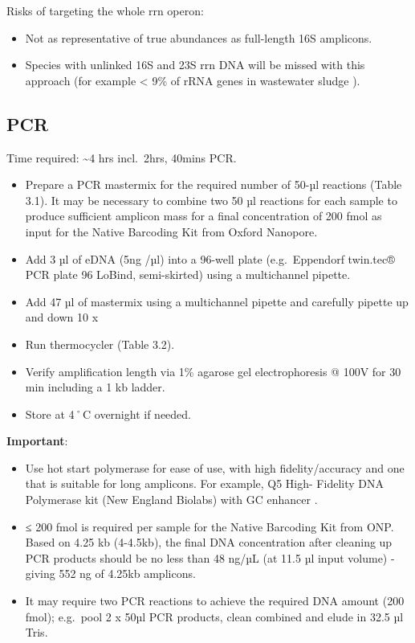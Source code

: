 \documentclass[
]{book}
\providecommand{\tightlist}{%
  \setlength{\itemsep}{0pt}\setlength{\parskip}{0pt}}
\begin{document}
Risks of targeting the whole rrn operon:

\begin{itemize}
\tightlist
\item
  Not as representative of true abundances as full-length 16S amplicons.
\item
  Species with unlinked 16S and 23S rrn DNA will be missed with this approach (for example \textless{} 9\% of rRNA genes in wastewater sludge \citep{Brewer2020}).
\end{itemize}

\subsection{PCR}\label{pcr}

Time required: \textasciitilde4 hrs incl.~2hrs, 40mins PCR.

\begin{itemize}
\tightlist
\item
  Prepare a PCR mastermix for the required number of 50-µl reactions (Table 3.1). It may be necessary to combine two 50 µl reactions for each sample to produce sufficient amplicon mass for a final concentration of 200 fmol as input for the Native Barcoding Kit from Oxford Nanopore.
\item
  Add 3 µl of eDNA (5ng /µl) into a 96-well plate (e.g.~Eppendorf twin.tec® PCR plate 96 LoBind, semi-skirted) using a multichannel pipette.
\item
  Add 47 µl of mastermix using a multichannel pipette and carefully pipette up and down 10 x
\item
  Run thermocycler (Table 3.2).
\item
  Verify amplification length via 1\% agarose gel electrophoresis @ 100V for 30 min including a 1 kb ladder.
\item
  Store at 4˚C overnight if needed.
\end{itemize}

\textbf{Important}:

\begin{itemize}
\item
  Use hot start polymerase for ease of use, with high fidelity/accuracy and one that is suitable for long amplicons. For example, Q5 High- Fidelity DNA Polymerase kit (New England Biolabs) with GC enhancer \citep{Martijn2019}.
\item
  ≤ 200 fmol is required per sample for the Native Barcoding Kit from ONP. Based on 4.25 kb (4-4.5kb), the final DNA concentration after cleaning up PCR products should be no less than 48 ng/µL (at 11.5 µl input volume) - giving 552 ng of 4.25kb amplicons.
\item
  It may require two PCR reactions to achieve the required DNA amount (200 fmol); e.g.~pool 2 x 50µl PCR products, clean combined and elude in 32.5 µl Tris.

  ~ ~
\end{itemize}
\end{document}
